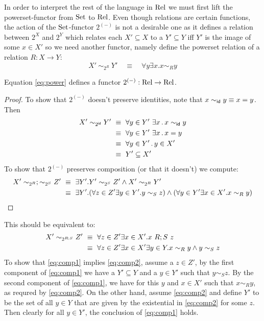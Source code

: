In order to interpret
the rest of the language in $\mathrm{Rel}$ we must first lift the
powerset-functor from $\mathrm{Set}$ to $\mathrm{Rel}$. 
Even though relations are certain functions, the action
of the $\mathrm{Set}$-functor $2^{(-)}$ is not a desirable one as it defines a
relation between $2^X$ and $2^Y$ which relates each $X' \subseteq
X$ to a $Y' \subseteq Y$ iff $Y'$ is the image of some $x \in X'$ so
we need another functor, namely define the powerset relation of a
relation $R : X \to Y$:
%
\begin{equation}\label{eq:power}
X' ~ \sim_{2^R} ~ Y' \quad \equiv \quad \forall y \exists x . x \sim_R y
\end{equation}
% 
\begin{lemma}
Equation \eqref{eq:power} defines a functor $2^{(-)}: \mathrm{Rel} \to \mathrm{Rel}$.
\end{lemma}
\begin{proof}
  To show that $2^{(-)}$ doesn't preserve identities, note that $x \sim_{\mathsf{id}} y
  \equiv x = y$. Then 
  \begin{align*}
    X' \sim_{2^{\mathsf{id}}} Y' & ~ \equiv ~ \forall y \in Y' ~ \exists x \,.\, x \sim_{\mathsf{id}} y\\
&~\equiv~ \forall y \in Y' ~ \exists x\,.\, x = y \\
&~\equiv~\forall y \in Y' \,.\, y \in X'\\
& ~\equiv ~ Y' \subseteq X'
  \end{align*}
  To show that $2^{(-)}$ preserves composition (or that it doesn't) we
  compute:
  \begin{align}
X' \sim_{2^R};\sim_{2^S} Z'& ~ \equiv ~\exists Y'. Y' \sim_{2^S} Z' \wedge X' \sim_{2^R} Y'\notag\\
\label{eq:comp1}  & ~ \equiv ~ \exists Y'.(\forall z\in Z'\exists y\in
Y'. y \sim_S z)\wedge (\forall y\in Y' \exists x \in X'. x \sim_R y) 
  \end{align}
\end{proof}
%
This should be equivalent to:
\begin{align}
X' \sim_{2^{R;S}} Z' &~\equiv~ \forall z\in Z' \exists x \in X'. x~ R;S~ z\notag\\
\label{eq:comp2}&~\equiv~ \forall z\in Z' \exists x\in X'\exists y\in Y. x \sim_R y \wedge y \sim_S z
\end{align}
To show that \eqref{eq:comp1} implies \eqref{eq:comp2}, assume a $z \in
Z'$, by the first component of \eqref{eq:comp1} we have a $Y'
\subseteq Y$ and a $y \in Y'$
such that $y \sim_S z$. By the second component of \eqref{eq:comp1},
we have for this $y$ and $x \in X'$ such that $x \sim_R y$, as requred
by \eqref{eq:comp2}. On the other hand, assume \eqref{eq:comp2} and
define $Y'$ to be the set of all $y \in Y$ that are given by the
existential in \eqref{eq:comp2} for some $z$. Then clearly for all $y
\in Y'$, the conclusion of \eqref{eq:comp1} holds. 

